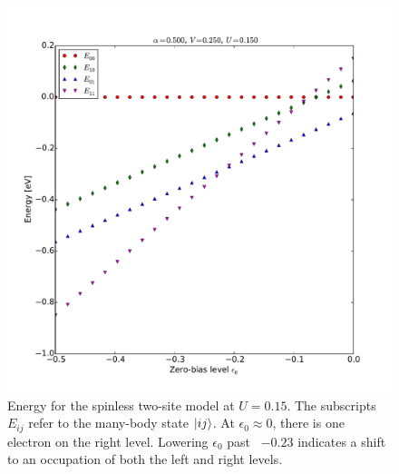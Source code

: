 \begin{figure}[h]
    \centering
    \includegraphics[height=.45\textheight]{pdf/energy/perrin_distribution_u2.pdf}
    \caption{Energy for the spinless two-site model at $U=0.15$. The subscripts $E_{ij}$ refer to the many-body state $\ket{i j}$. At $\epsilon_0 \approx 0$, there is one electron on the right level. Lowering $\epsilon_0$ past ~$-0.23$ indicates a shift to an occupation of both the left and right levels.  }
    \label{fig:perrinenergy2}
\end{figure}
